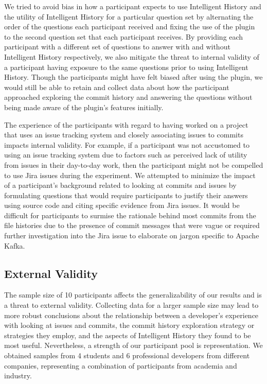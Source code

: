 We tried to avoid bias in how a participant expects to use Intelligent History 
and the utility of Intelligent History for a particular question set 
by alternating the order of the questions each participant received 
and fixing the use of the plugin to the second question set that each participant receives.
By providing each participant with a different set of questions to answer with 
and without Intelligent History respectively,
we also mitigate the threat to internal validity of a participant having 
exposure to the same questions prior to using Intelligent History.
Though the participants might have felt biased after using the plugin,
we would still be able to retain and collect data about how the participant approached 
exploring the commit history and answering the questions without being made aware of the plugin's features initially.

The experience of the participants with regard to having worked on a project that uses an issue tracking system 
and closely associating issues to commits impacts internal validity.
For example, if a participant was not accustomed to using an issue tracking system due to factors such as
perceived lack of utility from issues in their day-to-day work, then the participant might not be compelled to use Jira
issues during the experiment.
We attempted to minimize the impact of a participant's background related 
to looking at commits and issues by formulating questions 
that would require participants to justify their answers 
using source code and citing specific evidence from Jira issues.
It would be difficult for participants to surmise the rationale
behind most commits from the file histories due to the presence of commit messages that were vague or required further
investigation into the Jira issue to elaborate on jargon specific to Apache Kafka.

\subsection{External Validity}

The sample size of 10 participants affects the generalizability of our results and is a threat to external validity.
Collecting data for a larger sample size may lead to more robust conclusions about the relationship 
between a developer's experience with looking at issues and commits,
the commit history exploration strategy or strategies they employ, 
and the aspects of Intelligent History they found to be most useful.
Nevertheless, a strength of our participant pool is representation. 
We obtained samples from 4 students and 6 professional developers from different companies,
representing a combination of participants from academia and industry.


